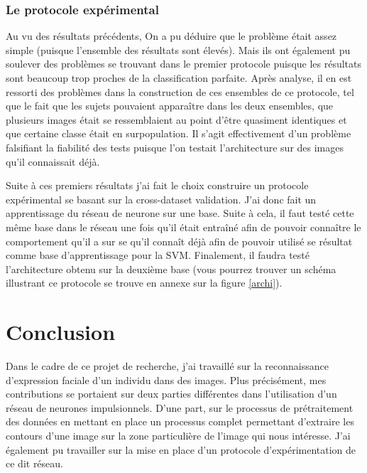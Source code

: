 \documentclass[12pt]{article}
\begin{document}
\subsubsection{Le protocole expérimental}

Au vu des résultats précédents, On a pu déduire que le problème était assez simple (puisque l'ensemble des résultats sont élevés). Mais ils ont également pu soulever des problèmes se trouvant dans le premier protocole puisque les résultats sont beaucoup trop proches de la classification parfaite. Après analyse, il en est ressorti des problèmes dans la construction de ces ensembles de ce protocole, tel que le fait que les sujets pouvaient apparaître dans les deux ensembles, que plusieurs images était se ressemblaient au point d'être quasiment identiques et que certaine classe était en surpopulation. Il s'agit effectivement d'un problème falsifiant la fiabilité des tests puisque l'on testait l'architecture sur des images qu'il connaissait déjà.

Suite à ces premiers résultats j'ai fait le choix construire un protocole expérimental se basant sur la cross-dataset validation. J'ai donc fait un apprentissage du réseau de neurone sur une base. Suite à cela, il faut testé cette même base dans le réseau une fois qu'il était entraîné afin de pouvoir connaître le comportement qu'il a sur se qu'il connaît déjà afin de pouvoir utilisé se résultat comme base d'apprentissage pour la SVM. Finalement, il faudra testé l'architecture obtenu sur la deuxième base (vous pourrez trouver un schéma illustrant ce protocole se trouve en annexe sur la figure \ref{archi}).

\pagebreak

\section{Conclusion}

Dans le cadre de ce projet de recherche, j'ai travaillé sur la reconnaissance d'expression faciale d'un individu dans des images. Plus précisément, mes contributions se portaient sur deux parties différentes dans l'utilisation d'un réseau de neurones impulsionnels. D'une part, sur le processus de prétraitement des données en mettant en place un processus complet permettant d'extraire les contours d'une image sur la zone particulière de l'image qui nous intéresse. J'ai également pu travailler sur la mise en place d'un protocole d'expérimentation de ce dit réseau.
\end{document}
